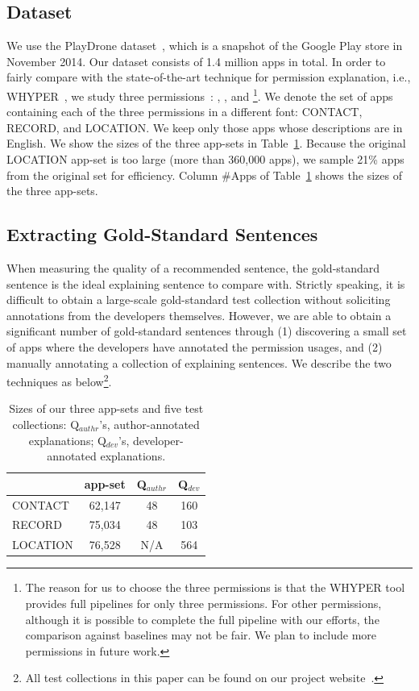 \subsection{Dataset}

We use the PlayDrone dataset~\cite{conf/sigmetrics/ViennotGN14}, which is a snapshot of the Google Play store in November 2014. Our dataset consists of 1.4 million apps in total. 
In order to fairly compare with the state-of-the-art technique for permission explanation, i.e., WHYPER~\cite{conf/uss/PanditaXYEX13}, we study three permissions~\cite{permgroup}: , , and \footnote{The reason for us to choose the three permissions is that the WHYPER tool~\cite{conf/uss/PanditaXYEX13} provides full pipelines for only three permissions. For other permissions, although it is possible to complete the full pipeline with our efforts, the comparison against baselines may not be fair. We plan to include more permissions in future work. }. 
We denote the set of apps containing each of the three permissions in a different font: \textsf{CONTACT}, \textsf{RECORD}, and \textsf{LOCATION}. 
We keep only those apps whose descriptions are in English. 
We show the sizes of the three app-sets in Table~\ref{tab:stat}. 
Because the original \textsf{LOCATION} app-set is too large (more than 360,000 apps), we sample 21\% apps from the original set for efficiency.
Column \#Apps of Table~\ref{tab:stat} shows the sizes of the three app-sets. 

\subsection{Extracting Gold-Standard Sentences}
\label{sec:gold}

When measuring the quality of a recommended sentence, the gold-standard sentence is the ideal explaining sentence to compare with. 
Strictly speaking, it is difficult to obtain a large-scale gold-standard test collection without soliciting annotations from the developers themselves. However, we are able to obtain a significant number of gold-standard sentences through (1) discovering a small set of apps where the developers have annotated the permission usages, and (2) manually annotating a collection of explaining sentences. 
We describe the two techniques as below\footnote{All test collections in this paper can be found on our project website~\cite{clapproj}.}. 

\begin{table}[t]
\caption{Sizes of our three app-sets and five test collections: Q$_{authr}$'s, author-annotated explanations; Q$_{dev}$'s, developer-annotated explanations. \label{tab:stat}}
\centering
\begin{tabular}{p{1.3cm}||c||c||c}
\hline
  & app-set & Q$_{authr}$ & Q$_{dev}$\\ \hline
\textsf{CONTACT} & 62,147 &  48 &  160\\ 
\textsf{RECORD} & 75,034  &  48 &  103 \\ 
\textsf{LOCATION} & 76,528 &  N/A & 564 \\ \hline
\end{tabular}
\end{table} 

